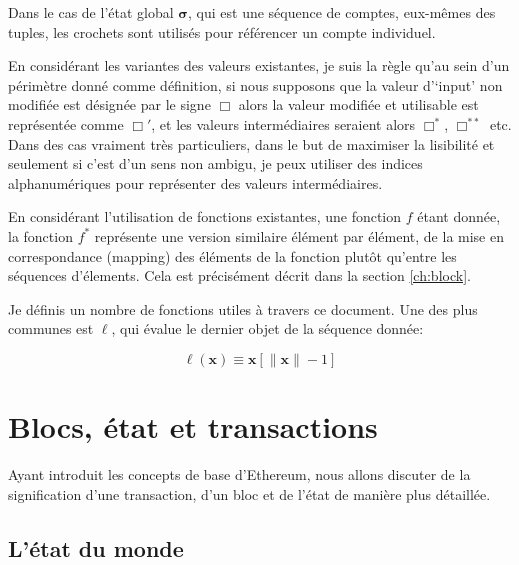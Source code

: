 \documentclass[9pt,oneside]{amsart}
\begin{document}
\begin{multicols}{2}
Dans le cas de l'état global $\boldsymbol{\sigma}$, qui est une séquence de comptes, eux-mêmes des tuples, les crochets sont utilisés pour référencer un compte individuel.

En considérant les variantes des valeurs existantes, je suis la règle qu'au sein d'un périmètre donné comme définition, si nous supposons que la valeur d'`input' non modifiée est désignée par le signe $\Box$ alors la valeur modifiée et utilisable est représentée comme $\Box'$, et les valeurs intermédiaires seraient alors $\Box^*$, $\Box^{**}$ etc. Dans des cas vraiment très particuliers, dans le but de maximiser la lisibilité et seulement si c'est d'un sens non ambigu, je peux utiliser des indices alphanumériques pour représenter des valeurs intermédiaires.		 

En considérant l'utilisation de fonctions existantes, une fonction $f$ étant donnée, la fonction $f^*$ représente une version similaire élément par élément, de la mise en correspondance (mapping) des éléments de la fonction plutôt qu'entre les séquences d’élements. Cela est précisément décrit dans la section \ref{ch:block}.

Je définis un nombre de fonctions utiles à travers ce document. Une des plus communes est $\ell$, qui évalue le dernier objet de la séquence donnée:

\begin{equation}
\ell(\mathbf{x}) \equiv \mathbf{x}[\lVert \mathbf{x} \rVert - 1]
\end{equation}

\section{Blocs, état et transactions} \label{ch:bst}

Ayant introduit les concepts de base d'Ethereum, nous allons discuter de la signification d'une transaction, d'un bloc et de l'état de manière plus détaillée.

\subsection{L'état du monde} \label{ch:state}


\end{multicols}
\end{document}
